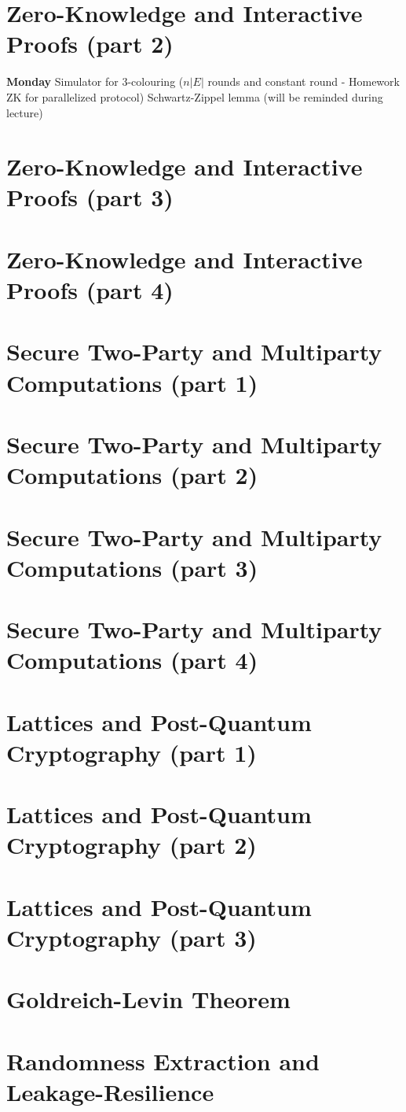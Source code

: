 \documentclass{llncs}
\begin{document}
\section{Zero-Knowledge and Interactive Proofs (part 2)}
\textbf{Monday}
Simulator for 3-colouring ($n|E|$ rounds and constant round - Homework ZK for parallelized protocol)
Schwartz-Zippel lemma (will be reminded during lecture)

\section{Zero-Knowledge and Interactive Proofs (part 3)}

\section{Zero-Knowledge and Interactive Proofs (part 4)}

\section{Secure Two-Party and Multiparty Computations (part 1)}

\section{Secure Two-Party and Multiparty Computations (part 2)}

\section{Secure Two-Party and Multiparty Computations (part 3)}

\section{Secure Two-Party and Multiparty Computations (part 4)}

\section{Lattices and Post-Quantum Cryptography (part 1)}

\section{Lattices and Post-Quantum Cryptography (part 2)}

\section{Lattices and Post-Quantum Cryptography (part 3)}

\section{Goldreich-Levin Theorem}

\section{Randomness Extraction and Leakage-Resilience}


\printbibliography %
\end{document}

